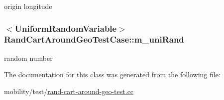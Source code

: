 origin longitude 

\subsubsection[{\texorpdfstring{m\+\_\+uni\+Rand}{m_uniRand}}]{$<${\bf Uniform\+Random\+Variable}$>$ Rand\+Cart\+Around\+Geo\+Test\+Case\+::m\+\_\+uni\+Rand\hspace{0.3cm}{\ttfamily [private]}}\hypertarget{classRandCartAroundGeoTestCase_afc6b202a99e0a36bba0d2a4c0ce7854b}{}\label{classRandCartAroundGeoTestCase_afc6b202a99e0a36bba0d2a4c0ce7854b}


random number 



The documentation for this class was generated from the following file\+:\begin{DoxyCompactItemize}
\item 
mobility/test/\hyperlink{rand-cart-around-geo-test_8cc}{rand-\/cart-\/around-\/geo-\/test.\+cc}\end{DoxyCompactItemize}
